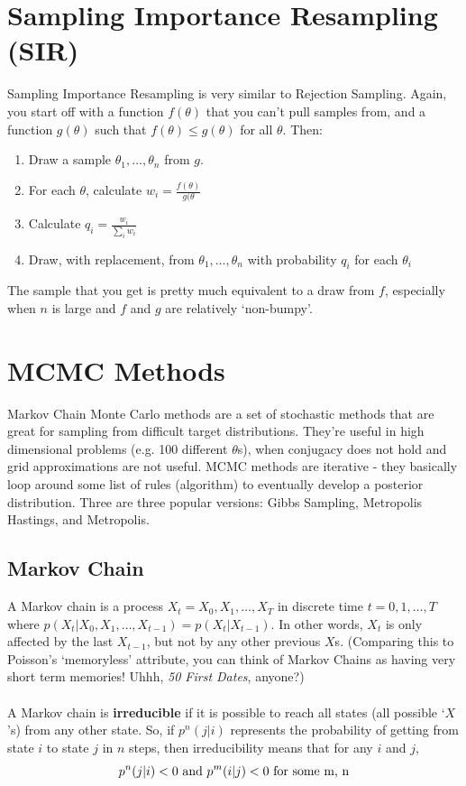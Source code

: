 \documentclass[12pt]{book}
\begin{document}
\section{Sampling Importance Resampling (SIR)}
Sampling Importance Resampling is very similar to Rejection Sampling. Again, you start off with a function $f(\theta)$ that you can't pull samples from, and a function $g(\theta)$ such that $f(\theta) \leq g(\theta)$ for all $\theta$. Then:
\begin{enumerate}
\item Draw a sample $\theta_1,\dots, \theta_n$ from $g$.
\item For each $\theta$, calculate $w_i = \frac{f(\theta)}{g(\theta}$
\item Calculate $q_i = \frac{w_i}{\sum_iw_i}$
\item Draw, with replacement, from $\theta_1,\dots, \theta_n$ with probability $q_i$ for each $\theta_i$
\end{enumerate}
The sample that you get is pretty much equivalent to a draw from $f$, especially when $n$ is large and $f$ and $g$ are relatively `non-bumpy'.

\section{MCMC Methods}
Markov Chain Monte Carlo methods are a set of stochastic methods that are great for sampling from difficult target distributions. They're useful in high dimensional problems (e.g. 100 different $\theta$s), when conjugacy does not hold and grid approximations are not useful. MCMC methods are iterative - they basically loop around some list of rules (algorithm) to eventually develop a posterior distribution. Three are three popular versions: Gibbs Sampling, Metropolis Hastings, and Metropolis. 

	\subsection{Markov Chain}
	A Markov chain is a process $X_t = X_0, X_1, \dots, X_T$ in discrete time $t=0,1, \dots,T$ where $p(X_t|X_0, X_1, \dots, X_{t-1}) = p(X_t|X_{t-1})$. In other words, $X_t$ is only affected by the last $X_{t-1}$, but not by any other previous $X$s. (Comparing this to Poisson's `memoryless' attribute, you can think of Markov Chains as having very short term memories! Uhhh, \textit{50 First Dates}, anyone?)
	\\\\
	A Markov chain is \textbf{irreducible} if it is possible to reach all states (all possible `$X$'s) from any other state. So, if $p^n(j|i)$ represents the probability of getting from state $i$ to state $j$ in $n$ steps, then irreducibility means that for any $i$ and $j$, 
	\begin{equation}
	p^n(j|i) < 0 \ \textnormal{and} \ p^m(i|j) < 0 \ \textnormal{for some m, n}
	\end{equation}
	
\end{document}
